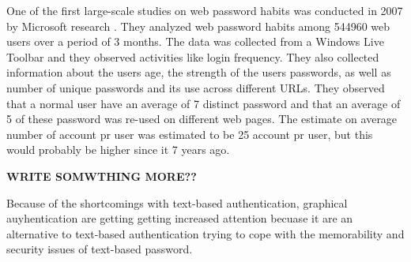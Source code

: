  One of the first large-scale studies on web password habits was conducted in 2007 by Microsoft research \cite{habits1}. They analyzed web password habits among 544960 web users over a period of 3 months. The data was collected from a Windows Live Toolbar and they observed activities like login frequency. They also collected information about the users age, the strength of the users passwords, as well as number of unique passwords and its use across different URLs. They observed that a normal user have an average of 7 distinct password and that an average of 5 of these password was re-used on different web pages. The estimate on average number of account pr user was estimated to be 25 account pr user, but this would probably be higher since it 7 years ago. 

  {\color{red} \bf WRITE SOMWTHING MORE??}

  Because of the shortcomings with text-based authentication, graphical auyhentication are getting getting increased attention becuase it are an alternative to text-based authentication trying to cope with the memorability and security issues of text-based password.
   
